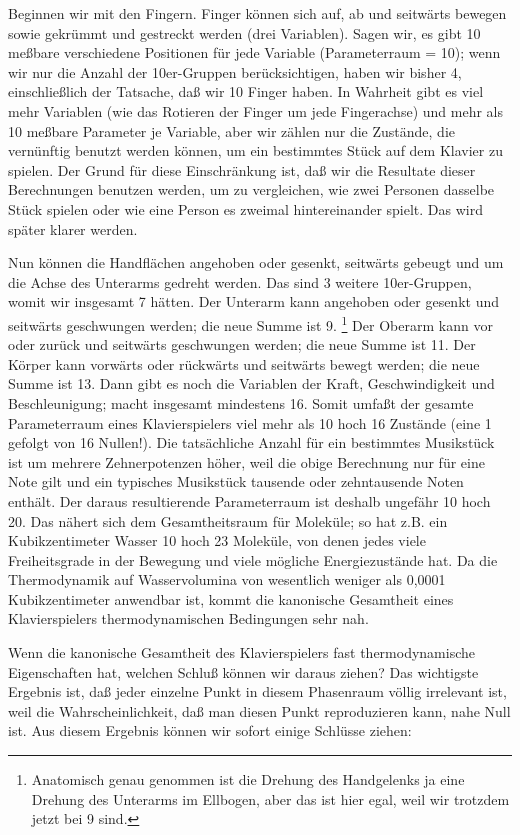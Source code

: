 Beginnen wir mit den Fingern.
Finger können sich auf, ab und seitwärts bewegen sowie gekrümmt und gestreckt werden (drei Variablen).
Sagen wir, es gibt 10 meßbare verschiedene Positionen für jede Variable (Parameterraum = 10); wenn wir nur die Anzahl der 10er-Gruppen berücksichtigen, haben wir bisher 4, einschließlich der Tatsache, daß wir 10 Finger haben.
In Wahrheit gibt es viel mehr Variablen (wie das Rotieren der Finger um jede Fingerachse) und mehr als 10 meßbare Parameter je Variable, aber wir zählen nur die Zustände, die vernünftig benutzt werden können, um ein bestimmtes Stück auf dem Klavier zu spielen.
Der Grund für diese Einschränkung ist, daß wir die Resultate dieser Berechnungen benutzen werden, um zu vergleichen, wie zwei Personen dasselbe Stück spielen oder wie eine Person es zweimal hintereinander spielt.
Das wird später klarer werden.

Nun können die Handflächen angehoben oder gesenkt, seitwärts gebeugt und um die Achse des Unterarms gedreht werden.
Das sind 3 weitere 10er-Gruppen, womit wir insgesamt 7 hätten.
Der Unterarm kann angehoben oder gesenkt und seitwärts geschwungen werden; die neue Summe ist 9.
\footnote{Anatomisch genau genommen ist die Drehung des Handgelenks ja eine Drehung des Unterarms im Ellbogen, aber das ist hier egal, weil wir trotzdem jetzt bei 9 sind.}
Der Oberarm kann vor oder zurück und seitwärts geschwungen werden; die neue Summe ist 11.
Der Körper kann vorwärts oder rückwärts und seitwärts bewegt werden; die neue Summe ist 13.
Dann gibt es noch die Variablen der Kraft, Geschwindigkeit und Beschleunigung; macht insgesamt mindestens 16.
Somit umfaßt der gesamte Parameterraum eines Klavierspielers viel mehr als 10 hoch 16 Zustände (eine 1 gefolgt von 16 Nullen!).
Die tatsächliche Anzahl für ein bestimmtes Musikstück ist um mehrere Zehnerpotenzen höher, weil die obige Berechnung nur für eine Note gilt und ein typisches Musikstück tausende oder zehntausende Noten enthält.
Der daraus resultierende Parameterraum ist deshalb ungefähr 10 hoch 20.
Das nähert sich dem Gesamtheitsraum für Moleküle; so hat z.B. ein Kubikzentimeter Wasser 10 hoch 23 Moleküle, von denen jedes viele Freiheitsgrade in der Bewegung und viele mögliche Energiezustände hat.
Da die Thermodynamik auf Wasservolumina von wesentlich weniger als 0,0001 Kubikzentimeter anwendbar ist, kommt die kanonische Gesamtheit eines Klavierspielers thermodynamischen Bedingungen sehr nah.

Wenn die kanonische Gesamtheit des Klavierspielers fast thermodynamische Eigenschaften hat, welchen Schluß können wir daraus ziehen?
Das wichtigste Ergebnis ist, daß jeder einzelne Punkt in diesem Phasenraum völlig irrelevant ist, weil die Wahrscheinlichkeit, daß man diesen Punkt reproduzieren kann, nahe Null ist.
Aus diesem Ergebnis können wir sofort einige Schlüsse ziehen:

